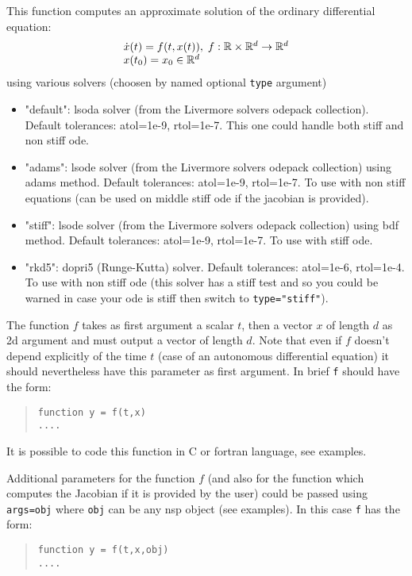 \begin{mandescription}

This function computes an approximate solution of the ordinary differential equation:
$$
\begin{array}{l}
   \dot{x}(t) = f(t, x(t)), \; f: \mathbb R \times \mathbb R^d \rightarrow  \mathbb R^d \\
   x(t_0) = x_0  \in  \mathbb R^d
\end{array}
$$
using various solvers (choosen by named optional \verb+type+ argument) 
\begin{itemize}
\item "default": lsoda solver (from the Livermore solvers odepack collection). Default tolerances: atol=1e-9,
  rtol=1e-7. This one could handle both stiff and non stiff ode.
\item "adams": lsode solver (from the Livermore solvers odepack collection) using adams method. Default tolerances:
  atol=1e-9, rtol=1e-7. To use with non stiff equations (can be used on middle stiff ode if the jacobian is provided).
\item "stiff": lsode solver (from the Livermore solvers odepack collection) using bdf method. Default tolerances:
  atol=1e-9, rtol=1e-7. To use with stiff ode.
\item "rkd5": dopri5 (Runge-Kutta) solver. Default tolerances: atol=1e-6, rtol=1e-4. To use with non stiff ode (this
solver has a stiff test and so you could be warned in case your ode is stiff then switch to \verb+type="stiff"+).
\end{itemize}


The function $f$ takes as first argument a scalar $t$, then a vector $x$ of length $d$ as 2d argument and 
must output a vector of length $d$. Note that even if $f$ doesn't depend explicitly of the time $t$ (case of 
an autonomous differential equation) it should nevertheless have this parameter as first argument. 
In brief \verb+f+ should have the form:
\begin{quote}
{\tt function y = f(t,x) \\
      ....}
  \end{quote}
It is possible to code this function in C or fortran language, see examples. 

Additional parameters for the function $f$ (and also for the function which computes the Jacobian 
if it is provided by the user) could be passed using \verb+args=obj+ where \verb+obj+ can be any nsp 
object (see examples). In this case \verb+f+ has the form:
\begin{quote}
{\tt function y = f(t,x,obj) \\
      ....}
\end{quote}



\end{mandescription}
